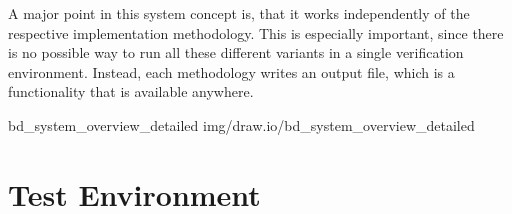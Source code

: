 A major point in this system concept is, that it works independently of the respective implementation methodology.
This is especially important, since there is no possible way to run all these different variants in a single verification environment.
Instead, each methodology writes an output file, which is a functionality that is available anywhere.

 {bd_system_overview_detailed} {img/draw.io/bd_system_overview_detailed}


\section{Test Environment}
